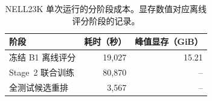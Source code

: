 \begin{table}[htbp]
\caption{NELL23K 单次运行的分阶段成本。显存数值对应离线评分阶段的记录。}
\label{tab:cost}
\centering\small
\begin{tabular}{lrr}
\toprule
阶段 & 耗时（秒） & 峰值显存（GiB） \\
\midrule
冻结 B1 离线评分 & 19,027 & 15.21 \\
Stage~2 联合训练 & 80,870 & -- \\
全测试候选重排 & 3,567 & -- \\
\bottomrule
\end{tabular}
\end{table}

